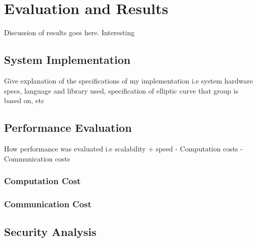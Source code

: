 \chapter{Evaluation and Results}
\label{chap:evaluation_and_results}

Discussion of results goes here. Interesting

\section{System Implementation}

Give explanation of the specifications of my implementation i.e system hardware specs, language and library used, specification of elliptic curve that group is based on, etc


\section{Performance Evaluation}

	How performance was evaluated i.e scalability + speed
- Computation costs
- Communication costs

\subsection{Computation Cost}


\subsection{Communication Cost}


\section{Security Analysis}